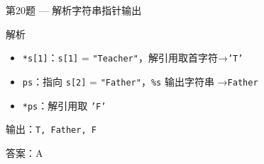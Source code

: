 \begin{frame}{第20题 --- 解析}{字符串指针输出}
    \small
    \begin{alertblock}{解析}
        \begin{itemize}
            \setlength{\itemsep}{0pt}
            \item \texttt{*s[1]}：\texttt{s[1]} = \texttt{"Teacher"}，解引用取首字符→\texttt{'T'}
            \item \texttt{ps}：指向 \texttt{s[2]} = \texttt{"Father"}，\texttt{\%s} 输出字符串 →\texttt{Father}
            \item \texttt{*ps}：解引用取 \texttt{'F'}
        \end{itemize}
        输出：\texttt{T,\ Father,\ F}
        \vspace{0.5em}

        {\color{highlight}答案：A}
    \end{alertblock}
\end{frame}
